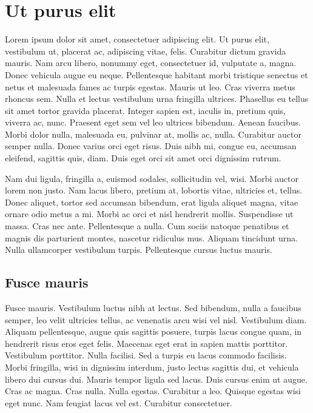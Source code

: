 
  \appendix

  \chapter{Ut purus elit}

  Lorem ipsum dolor sit amet, consectetuer adipiscing elit. Ut purus
  elit, vestibulum ut, placerat ac, adipiscing vitae, felis. Curabitur
  dictum gravida mauris. Nam arcu libero, nonummy eget, consectetuer id,
  vulputate a, magna. Donec vehicula augue eu neque. Pellentesque
  habitant morbi tristique senectus et netus et malesuada fames ac
  turpis egestas. Mauris ut leo. Cras viverra metus rhoncus sem. Nulla
  et lectus vestibulum urna fringilla ultrices. Phasellus eu tellus sit
  amet tortor gravida placerat. Integer sapien est, iaculis in, pretium
  quis, viverra ac, nunc. Praesent eget sem vel leo ultrices
  bibendum. Aenean faucibus. Morbi dolor nulla, malesuada eu, pulvinar
  at, mollis ac, nulla. Curabitur auctor semper nulla.  Donec varius
  orci eget risus. Duis nibh mi, congue eu, accumsan eleifend, sagittis
  quis, diam. Duis eget orci sit amet orci dignissim rutrum.

  Nam dui ligula, fringilla a, euismod sodales, sollicitudin vel,
  wisi. Morbi auctor lorem non justo. Nam lacus libero, pretium at,
  lobortis vitae, ultricies et, tellus. Donec aliquet, tortor sed
  accumsan bibendum, erat ligula aliquet magna, vitae ornare odio metus
  a mi. Morbi ac orci et nisl hendrerit mollis. Suspendisse ut
  massa. Cras nec ante. Pellentesque a nulla.  Cum sociis natoque
  penatibus et magnis dis parturient montes, nascetur ridiculus
  mus. Aliquam tincidunt urna. Nulla ullamcorper vestibulum
  turpis. Pellentesque cursus luctus mauris.

  \section{Fusce mauris}

  Fusce mauris. Vestibulum luctus nibh at lectus. Sed bibendum, nulla a
  faucibus semper, leo velit ultricies tellus, ac venenatis arcu wisi
  vel nisl.  Vestibulum diam. Aliquam pellentesque, augue quis sagittis
  posuere, turpis lacus congue quam, in hendrerit risus eros eget
  felis. Maecenas eget erat in sapien mattis porttitor. Vestibulum
  porttitor. Nulla facilisi.  Sed a turpis eu lacus commodo
  facilisis. Morbi fringilla, wisi in dignissim interdum, justo lectus
  sagittis dui, et vehicula libero dui cursus dui. Mauris tempor ligula
  sed lacus. Duis cursus enim ut augue. Cras ac magna.  Cras
  nulla. Nulla egestas. Curabitur a leo. Quisque egestas wisi eget
  nunc. Nam feugiat lacus vel est. Curabitur consectetuer.

  